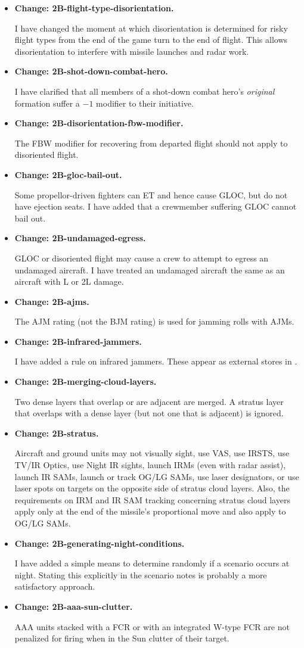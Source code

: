 \documentclass[10pt]{report}
\newcommand{\itemtag}[1]{\item \textbf{Change: #1.}\par}
\begin{document}
\begin{itemize}
    \itemtag{2B-flight-type-disorientation} I have changed the moment at which disorientation is determined for risky flight types from the end of the game turn to the end of flight. This allows disorientation to interfere with missile launches and radar work.
    
    \itemtag{2B-shot-down-combat-hero} I have clarified that all members of a shot-down combat hero’s \emph{original} formation suffer a $-1$ modifier to their initiative.
    
    \itemtag{2B-disorientation-fbw-modifier} The FBW modifier for recovering from departed flight should not apply to disoriented flight.

    \itemtag{2B-gloc-bail-out} Some propellor-driven fighters can ET and hence cause GLOC, but do not have ejection seats. I have added that a crewmember suffering GLOC cannot bail out.

    \itemtag{2B-undamaged-egress} GLOC or disoriented flight may cause a crew to attempt to egress an undamaged aircraft. I have treated an undamaged aircraft the same as an aircraft with L or 2L damage.
    
    \itemtag{2B-ajms} The AJM rating (not the BJM rating) is used for jamming rolls with AJMs.
    
    \itemtag{2B-infrared-jammers} I have added a rule on infrared jammers. These appear as external stores in {\TSOH}.
    
    \itemtag{2B-merging-cloud-layers} Two dense layers that overlap or are adjacent are merged. A stratus layer that overlaps with a dense layer (but not one that is adjacent) is ignored.
    
    \itemtag{2B-stratus} Aircraft and ground units may not visually sight, use VAS, use IRSTS, use TV/IR Optics, use Night IR sights, launch IRMs (even with radar assist), launch IR SAMs, launch or track OG/LG SAMs, use laser designators, or use laser spots on targets on the opposite side of stratus cloud layers. Also, the requirements on IRM and IR SAM tracking concerning stratus cloud layers apply only at the end of the missile’s proportional move and also apply to OG/LG SAMs.
    
    \itemtag{2B-generating-night-conditions} I have added a simple means to determine randomly if a scenario occurs at night. Stating this explicitly in the scenario notes is probably a more satisfactory approach.
    
    \itemtag{2B-aaa-sun-clutter} AAA units stacked with a FCR or with an integrated W-type FCR are not penalized for firing when in the Sun clutter of their target.
    

\end{itemize}
\end{document}
